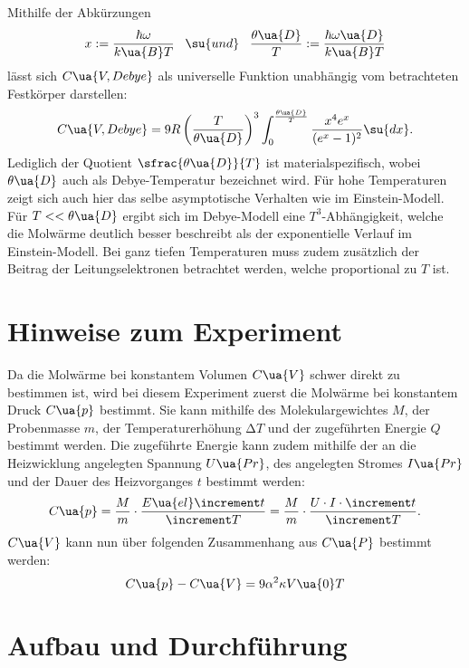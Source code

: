 Mithilfe der Abkürzungen
\begin{equation}
  x:=\frac{\hbar\omega}{k\ua{B}T} \,\,\,\,\, \su{und} \,\,\,\,\, \frac{\theta\ua{D}}{T} := \frac{\hbar\omega\ua{D}}{k\ua{B}T}
\end{equation}
lässt sich $C\ua{V,Debye}$ als universelle Funktion unabhängig vom betrachteten
Festkörper darstellen:
\begin{equation}
  C\ua{V,Debye} = 9R \left(\frac{T}{\theta\ua{D}}\right)^3\int_0^{\frac{\theta\ua{D}}{T}} \frac{x^4e^x}{(e^x-1)^2}\su{dx}.
\end{equation}
Lediglich der Quotient $\sfrac{\theta\ua{D}}{T}$ ist
materialspezifisch, wobei $\theta\ua{D}$ auch als Debye-Temperatur bezeichnet wird.
Für hohe Temperaturen zeigt sich auch hier das selbe asymptotische Verhalten wie
im Einstein-Modell. Für $T<<\theta\ua{D}$ ergibt sich im Debye-Modell eine $T^3$-Abhängigkeit,
welche die Molwärme deutlich besser beschreibt als der exponentielle Verlauf im
Einstein-Modell.
Bei ganz tiefen Temperaturen muss zudem zusätzlich der Beitrag der Leitungselektronen
betrachtet werden, welche proportional zu $T$ ist.

\section{Hinweise zum Experiment}

Da die Molwärme bei konstantem Volumen $C\ua{V}$ schwer direkt zu bestimmen ist,
wird bei diesem Experiment zuerst die Molwärme bei konstantem Druck $C\ua{p}$
bestimmt. Sie kann mithilfe des Molekulargewichtes $M$, der Probenmasse $m$,
der Temperaturerhöhung $\increment T$ und der zugeführten Energie $Q$ bestimmt werden.
Die zugeführte Energie kann zudem mithilfe der an die Heizwicklung angelegten Spannung
$U\ua{Pr}$, des angelegten Stromes $I\ua{Pr}$ und der Dauer des Heizvorganges $t$ bestimmt werden:
\begin{equation}
  \label{eqn:c_p}
  C\ua{p} = \frac{M}{m}\cdot\frac{E\ua{el}\increment t}{\increment T} = \frac{M}{m}\cdot\frac{U\cdot I\cdot \increment t}{\increment T}.
\end{equation}
$C\ua{V}$ kann nun über folgenden Zusammenhang aus $C\ua{P}$ bestimmt werden:
\begin{equation}
  \label{eqn:c_p-c_v}
  C\ua{p}-C\ua{V} = 9\alpha^2\kappa V\ua{0}T
\end{equation}

\newpage

\section{Aufbau und Durchführung}

